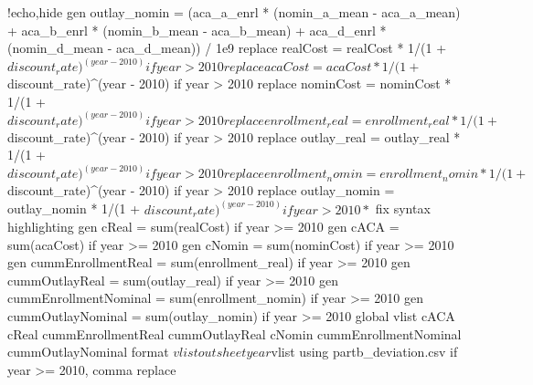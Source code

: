 \documentclass{article}
\begin{document}
\begin{Statacode}{!echo,hide}
gen outlay_nomin = (aca_a_enrl * (nomin_a_mean - aca_a_mean) + aca_b_enrl * (nomin_b_mean - aca_b_mean) + aca_d_enrl * (nomin_d_mean - aca_d_mean)) / 1e9
replace realCost = realCost * 1/(1 + $discount_rate)^(year - 2010) if year > 2010
replace acaCost = acaCost * 1/(1 + $discount_rate)^(year - 2010) if year > 2010
replace nominCost = nominCost * 1/(1 + $discount_rate)^(year - 2010) if year > 2010
replace enrollment_real = enrollment_real * 1/(1 + $discount_rate)^(year - 2010) if year > 2010
replace outlay_real = outlay_real * 1/(1 + $discount_rate)^(year - 2010) if year > 2010
replace enrollment_nomin = enrollment_nomin * 1/(1 + $discount_rate)^(year - 2010) if year > 2010
replace outlay_nomin = outlay_nomin * 1/(1 + $discount_rate)^(year - 2010) if year > 2010
* $ fix syntax highlighting
gen cReal = sum(realCost) if year >= 2010
gen cACA = sum(acaCost) if year >= 2010
gen cNomin = sum(nominCost) if year >= 2010
gen cummEnrollmentReal = sum(enrollment_real) if year >= 2010
gen cummOutlayReal = sum(outlay_real) if year >= 2010
gen cummEnrollmentNominal = sum(enrollment_nomin) if year >= 2010
gen cummOutlayNominal = sum(outlay_nomin) if year >= 2010
global vlist cACA  cReal cummEnrollmentReal cummOutlayReal cNomin cummEnrollmentNominal cummOutlayNominal 
format $vlist %
outsheet year $vlist using partb_deviation.csv if year >= 2010, comma replace
\end{Statacode}
\end{document}
